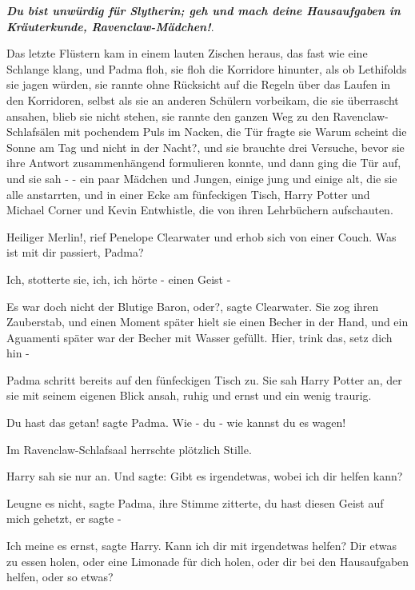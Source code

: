 \textbf{\emph{Du bist unwürdig für
Slytherin; geh und mach deine Hausaufgaben in Kräuterkunde,
Ravenclaw-Mädchen!}}\grqq{}.

Das letzte Flüstern kam in einem lauten Zischen heraus, das fast wie eine
Schlange klang, und Padma floh, sie floh die Korridore hinunter, als ob
Lethifolds sie jagen würden, sie rannte ohne Rücksicht auf die Regeln über das
Laufen in den Korridoren, selbst als sie an anderen Schülern vorbeikam, die sie
überrascht ansahen, blieb sie nicht stehen, sie rannte den ganzen Weg zu den
Ravenclaw-Schlafsälen mit pochendem Puls im Nacken, die Tür fragte sie \glqq{}
Warum scheint die Sonne am Tag und nicht in der Nacht?\grqq{}, und sie brauchte
drei Versuche, bevor sie ihre Antwort zusammenhängend formulieren konnte, und
dann ging die Tür auf, und sie sah - - ein paar Mädchen und Jungen, einige jung
und einige alt, die sie alle anstarrten, und in einer Ecke am fünfeckigen Tisch,
Harry Potter und Michael Corner und Kevin Entwhistle, die von ihren Lehrbüchern
aufschauten.

\glqq{}Heiliger Merlin!\grqq{}, rief Penelope Clearwater und erhob sich von einer
Couch. \glqq{}Was ist mit dir passiert, Padma?\grqq{}

\glqq{}Ich\grqq{}, stotterte sie, \glqq{}ich, ich hörte - einen Geist -\grqq{}

\glqq{}Es war doch nicht der Blutige Baron, oder?\grqq{}, sagte Clearwater. Sie
zog ihren Zauberstab, und einen Moment später hielt sie einen Becher in der
Hand, und ein Aguamenti später war der Becher mit Wasser gefüllt. \glqq{}Hier,
trink das, setz dich hin -\grqq{}

Padma schritt bereits auf den fünfeckigen Tisch zu. Sie sah Harry Potter an, der
sie mit seinem eigenen Blick ansah, ruhig und ernst und ein wenig traurig.

\glqq{}Du hast das getan!\grqq{} sagte Padma. \glqq{}Wie - du - wie kannst du es
wagen!\grqq{}

Im Ravenclaw-Schlafsaal herrschte plötzlich Stille.

Harry sah sie nur an. Und sagte: \glqq{}Gibt es irgendetwas, wobei ich dir helfen
kann?\grqq{}

\glqq{}Leugne es nicht\grqq{}, sagte Padma, ihre Stimme zitterte, \glqq{}du hast
diesen Geist auf mich gehetzt, er sagte -\grqq{}

\glqq{}Ich meine es ernst\grqq{}, sagte Harry. \glqq{}Kann ich dir mit irgendetwas
helfen? Dir etwas zu essen holen, oder eine Limonade für dich holen, oder dir
bei den Hausaufgaben helfen, oder so etwas?\grqq{}

